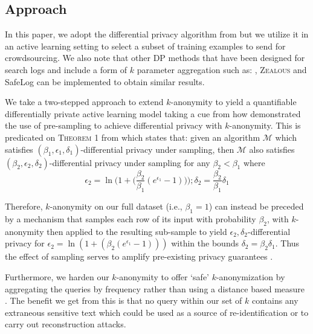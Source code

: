 \documentclass[letterpaper]{article}
\begin{document}
\subsection{Approach}
\label{approach}
In this paper, we adopt the differential privacy algorithm from \cite{li2012sampling} but we utilize it in an active learning setting to select a subset of training examples to send for crowdsourcing. We also note that other DP methods that have been designed for search logs and include a form of $k$ parameter aggregation such as: \cite{korolova2009releasing}, \textsc{Zealous} \cite{gotz2012publishing} and SafeLog \cite{zhang2016safelog} can be implemented to obtain similar results.

We take a two-stepped approach to extend $k$-anonymity to yield a quantifiable differentially private active learning model taking a cue from how \cite{li2012sampling} demonstrated the use of pre-sampling to achieve differential privacy with $k$-anonymity. This is predicated on \textsc{Theorem 1} from \cite{li2012sampling} which states that: given an algorithm $\mathcal{M}$ which satisfies $(\beta_1, \epsilon_1, \delta_1)$-differential privacy under sampling, then $\mathcal{M}$ also satisfies $(\beta_2, \epsilon_2, \delta_2)$-differential privacy under sampling for any $\beta_2 < \beta_1$ where
\begin{equation}
\epsilon_2 = \ln \Bigg(1 + \bigg(\frac{\beta_2}{\beta_1}(e^{\epsilon_1} - 1)\bigg)\Bigg); \delta_2 = \frac{\beta_2}{\beta_1}\delta_1
\end{equation}



Therefore, $k$-anonymity on our full dataset (i.e., $\beta_1 = 1$) can instead be preceded by a mechanism that samples each row of its input with probability $\beta_2$, with $k$-anonymity then applied to the resulting sub-sample to yield $\epsilon_2,\delta_2$-differential privacy for $\epsilon_2 = \ln(1 + (\beta_2(e^{\epsilon_1} - 1)))$ within the bounds $\delta_2 = \beta_2\delta_1$. Thus the effect of sampling serves to amplify pre-existing privacy guarantees \cite{balle2018privacy}.


Furthermore, we harden our $k$-anonymity to offer `safe' $k$-anonymization by aggregating the queries by frequency rather than using a distance based measure \cite{lefevre2006mondrian}. The benefit we get from this is that no query within our set of $k$ contains any extraneous sensitive text which could be used as a source of re-identification or to carry out reconstruction attacks.
\end{document}
